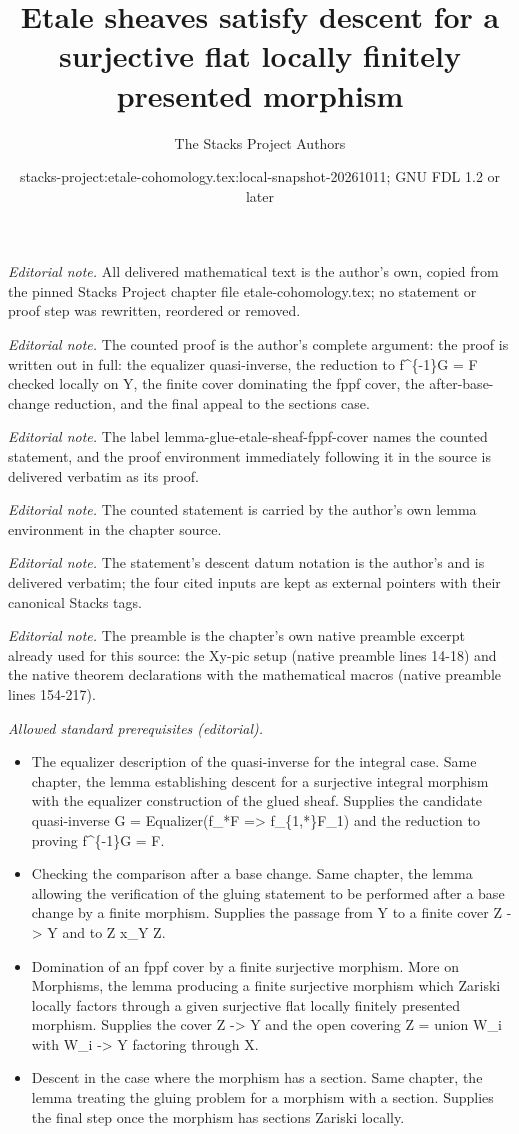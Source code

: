 \documentclass[10pt,a4paper]{amsart}
\title{Etale sheaves satisfy descent for a surjective flat locally finitely presented morphism}
\author{The Stacks Project Authors}
\date{stacks-project:etale-cohomology.tex:local-snapshot-20261011; GNU FDL 1.2 or later}
\theoremstyle{plain}
\theoremstyle{definition}
\theoremstyle{remark}
\numberwithin{equation}{subsection}
\begin{document}
\maketitle
\noindent\textit{Editorial note.} All delivered mathematical text is the author's own, copied from the pinned Stacks Project chapter file etale-cohomology.tex; no statement or proof step was rewritten, reordered or removed.\par\medskip
\noindent\textit{Editorial note.} The counted proof is the author's complete argument: the proof is written out in full: the equalizer quasi-inverse, the reduction to f\textasciicircum{}\{-1\}G = F checked locally on Y, the finite cover dominating the fppf cover, the after-base-change reduction, and the final appeal to the sections case.\par\medskip
\noindent\textit{Editorial note.} The label lemma-glue-etale-sheaf-fppf-cover names the counted statement, and the proof environment immediately following it in the source is delivered verbatim as its proof.\par\medskip
\noindent\textit{Editorial note.} The counted statement is carried by the author's own lemma environment in the chapter source.\par\medskip
\noindent\textit{Editorial note.} The statement's descent datum notation is the author's and is delivered verbatim; the four cited inputs are kept as external pointers with their canonical Stacks tags.\par\medskip
\noindent\textit{Editorial note.} The preamble is the chapter's own native preamble excerpt already used for this source: the Xy-pic setup (native preamble lines 14-18) and the native theorem declarations with the mathematical macros (native preamble lines 154-217).\par\medskip
\noindent\textit{Allowed standard prerequisites (editorial).}\begin{itemize}
\item The equalizer description of the quasi-inverse for the integral case. Same chapter, the lemma establishing descent for a surjective integral morphism with the equalizer construction of the glued sheaf. Supplies the candidate quasi-inverse G = Equalizer(f\_*F => f\_\{1,*\}F\_1) and the reduction to proving f\textasciicircum{}\{-1\}G = F.
\item Checking the comparison after a base change. Same chapter, the lemma allowing the verification of the gluing statement to be performed after a base change by a finite morphism. Supplies the passage from Y to a finite cover Z -> Y and to Z x\_Y Z.
\item Domination of an fppf cover by a finite surjective morphism. More on Morphisms, the lemma producing a finite surjective morphism which Zariski locally factors through a given surjective flat locally finitely presented morphism. Supplies the cover Z -> Y and the open covering Z = union W\_i with W\_i -> Y factoring through X.
\item Descent in the case where the morphism has a section. Same chapter, the lemma treating the gluing problem for a morphism with a section. Supplies the final step once the morphism has sections Zariski locally.
\end{itemize}\medskip
\end{document}
